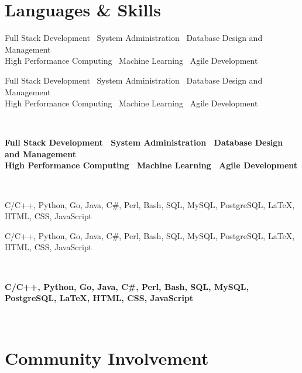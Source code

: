 \documentclass[letterpaper,10pt]{article}
\newcommand{\entry}[4]{\ifthenelse{\isempty{#4}}
{\slimentry{#1}{#2}}
{\begin{minipage}[t]{.12\textwidth}
\raggedleft{}
\hfill \textsc{#1}
\end{minipage}
\hfill\vline\hfill
\begin{minipage}[t]{.83\textwidth}
{\bf#2}\ifthenelse{\isempty{#3}}{}{\\\textit{#3}.}

\footnotesize{#4}
\end{minipage}\\
\vspace{.1cm}}}
\newcommand{\slimentry}[2]{\ifthenelse{\isempty{#1}}
{#2}
{\begin{minipage}[t]{.12\textwidth}
\hfill \textsc{#1}
\end{minipage}
\hfill\vline\hfill
\begin{minipage}[t]{.83\textwidth}
#2
\end{minipage}\\}
\vspace{.1cm}}
\begin{document}



\section{Languages \& Skills}
\entry{}
{Full Stack Development \textbullet\ System Administration \textbullet\ Database Design and Management \\ High Performance Computing \textbullet\ Machine Learning \textbullet\ Agile Development}
{}
{}

\entry{}
{C/C++, Python, Go, Java, C\#, Perl, Bash, SQL, MySQL, PostgreSQL, {\LaTeX}, HTML, CSS, JavaScript}
{}
{}


\section{Community Involvement}
\end{document}

